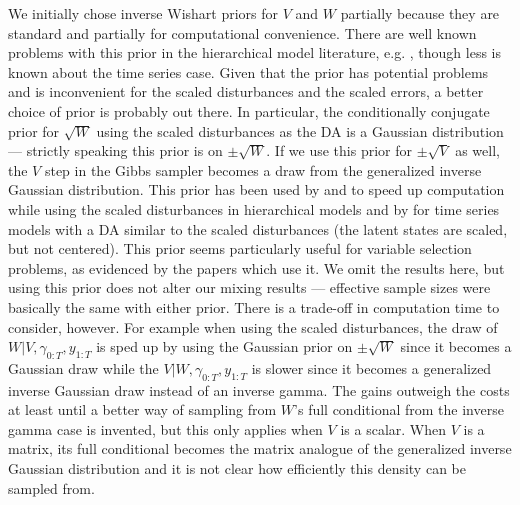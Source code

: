 \documentclass{article}
\begin{document}
We initially chose inverse Wishart priors for $V$ and $W$ partially because they are standard and partially for computational convenience. There are well known problems with this prior in the hierarchical model literature, e.g. \citet{gelman2006prior}, though less is known about the time series case. Given that the prior has potential problems and is inconvenient for the scaled disturbances and the scaled errors, a better choice of prior is probably out there. In particular, the conditionally conjugate prior for $\sqrt{W}$ using the scaled disturbances as the DA is a Gaussian distribution --- strictly speaking this prior is on $\pm \sqrt{W}$. If we use this prior for $\pm\sqrt{V}$ as well, the $V$ step in the Gibbs sampler becomes a draw from the generalized inverse Gaussian distribution. This prior has been used by \citet{fruhwirth2011bayesian} and \citet{fruhwirth2008bayesian} to speed up computation while using the scaled disturbances in hierarchical models and by \citet{fruhwirth2010stochastic} for time series models with a DA similar to the scaled disturbances (the latent states are scaled, but not centered). This prior seems particularly useful for variable selection problems, as evidenced by the papers which use it. We omit the results here, but using this prior does not alter our mixing results --- effective sample sizes were basically the same with either prior. There is a trade-off in computation time to consider, however. For example when using the scaled disturbances, the draw of $W|V,\gamma_{0:T},y_{1:T}$ is sped up by using the Gaussian prior on $\pm\sqrt{W}$ since it becomes a Gaussian draw while the $V|W,\gamma_{0:T},y_{1:T}$ is slower since it becomes a generalized inverse Gaussian draw instead of an inverse gamma. The gains outweigh the costs at least until a better way of sampling from $W$'s full conditional from the inverse gamma case is invented, but this only applies when $V$ is a scalar. When $V$ is a matrix, its full conditional becomes the matrix analogue of the generalized inverse Gaussian distribution and it is not clear how efficiently this density can be sampled from.
\end{document}
